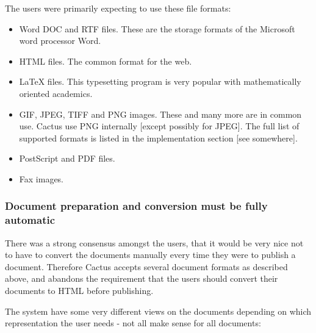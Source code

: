 The users were primarily expecting to use these file
formats:

\begin{itemize}
  
\item Word DOC and RTF files.  These are the storage formats
  of the Microsoft word processor Word.
\item HTML files.  The common format for the web.
\item LaTeX files.  This typesetting program is very popular
  with mathematically oriented academics.
\item GIF, JPEG, TIFF and PNG images.  These and many more
  are in common use.  Cactus use PNG internally [except
  possibly for JPEG].  The full list of supported formats is
  listed in the implementation section [see somewhere].
\item PostScript and PDF files.
\item Fax images.
\end{itemize}

\subsubsection{Document preparation and conversion must be fully automatic}

There was a strong consensus amongst the users, that it
would be very nice not to have to convert the documents
manually every time they were to publish a document.
Therefore Cactus accepts several document formats as
described above, and abandons the requirement that the users
should convert their documents to HTML before publishing.

The system have some very different views on the documents
depending on which representation the user needs - not all
make sense for all documents:

